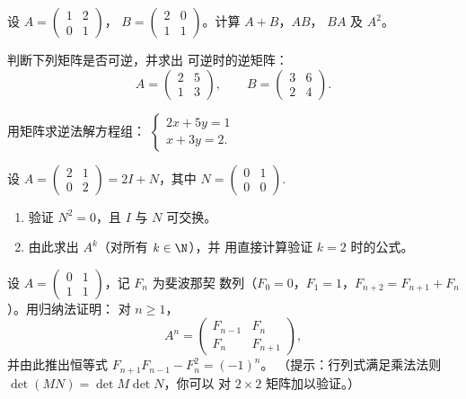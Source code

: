 \begin{exercise}[$\star$]\label{exo:g12:matrix:1}
设 $A = \begin{pmatrix} 1 & 2\\ 0 & 1 \end{pmatrix}$，
$B = \begin{pmatrix} 2 & 0\\ 1 & 1 \end{pmatrix}$。计算 $A + B$，$AB$，
$BA$ 及 $A^2$。
\end{exercise}

\begin{exercise}[$\star$]\label{exo:g12:matrix:2}
判断下列矩阵是否可逆，并求出
可逆时的逆矩阵：
\[
A = \begin{pmatrix} 2 & 5\\ 1 & 3\end{pmatrix}, \qquad
B = \begin{pmatrix} 3 & 6\\ 2 & 4\end{pmatrix}.
\]
\end{exercise}

\begin{exercise}[$\star$]\label{exo:g12:matrix:3}
用矩阵求逆法解方程组：
$\begin{cases} 2x + 5y = 1\\ x + 3y = 2 . \end{cases}$
\end{exercise}

\begin{exercise}[$\star\star$]\label{exo:g12:matrix:4}
设 $A = \begin{pmatrix} 2 & 1\\ 0 & 2\end{pmatrix} = 2I + N$，其中
$N = \begin{pmatrix} 0 & 1\\ 0 & 0 \end{pmatrix}$.
\begin{enumerate}
  \item 验证 $N^2 = 0$，且 $I$ 与 $N$ 可交换。
  \item 由此求出 $A^k$（对所有 $k \in \N$），并
        用直接计算验证 $k=2$ 时的公式。
\end{enumerate}
\end{exercise}

\begin{exercise}[$\star\star$]\label{exo:g12:matrix:5}
设 $A = \begin{pmatrix} 0 & 1\\ 1 & 1\end{pmatrix}$，记 $F_n$ 为斐波那契
数列（$F_0 = 0$，$F_1 = 1$，$F_{n+2} = F_{n+1} + F_n$）。用归纳法证明：
对 $n \geq 1$，
\[
A^n = \begin{pmatrix} F_{n-1} & F_n\\ F_n & F_{n+1}\end{pmatrix},
\]
并由此推出恒等式 $F_{n+1}F_{n-1} - F_n^2 = (-1)^n$。
（提示：行列式满足乘法法则 $\det(MN) = \det M \det N$，你可以
对 $2\times2$ 矩阵加以验证。）
\end{exercise}

